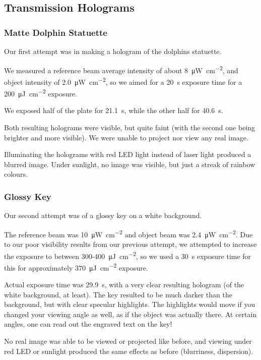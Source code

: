 \documentclass[a4paper]{scrartcl}
\begin{document}
\subsection{Transmission Holograms}
\subsubsection{Matte Dolphin Statuette}
Our first attempt was in making a hologram of the dolphins statuette.

We measured a reference beam average intensity of about \SI{8}{\micro\watt\per\centi\metre\squared}, and object intensity of \SI{2.0}{\micro\watt\per\centi\metre\squared}, so we aimed for a \SI{20}{\second} exposure time for a \SI{200}{\micro\joule\per\centi\metre\squared} exposure.

We exposed half of the plate for \SI{21.1}{\second}, while the other half for \SI{40.6}{\second}.

Both resulting holograms were visible, but quite faint (with the second one being brighter and more visible). We were unable to project nor view any real image.

Illuminating the holograms with red LED light instead of laser light produced a blurred image. Under sunlight, no image was visible, but just a streak of rainbow colours.

\subsubsection{Glossy Key}
Our second attempt was of a glossy key on a white background.

The reference beam was \SI{10}{\micro\watt\per\centi\metre\squared} and object beam was \SI{2.4}{\micro\watt\per\centi\metre\squared}. Due to our poor visibility results from our previous attempt, we attempted to increase the exposure to between 300-\SI{400}{\micro\joule\per\centi\metre\squared}, so we used a \SI{30}{\second} exposure time for this for approximately \SI{370}{\micro\joule\per\centi\metre\squared} exposure.

Actual exposure time was \SI{29.9}{\second}, with a very clear resulting hologram (of the white background, at least). The key resulted to be much darker than the background, but with clear specular highlights. The highlights would move if you changed your viewing angle as well, as if the object was actually there. At certain angles, one can read out the engraved text on the key!

No real image was able to be viewed or projected like before, and viewing under red LED or sunlight produced the same effects as before (blurriness, dispersion).
\end{document}
